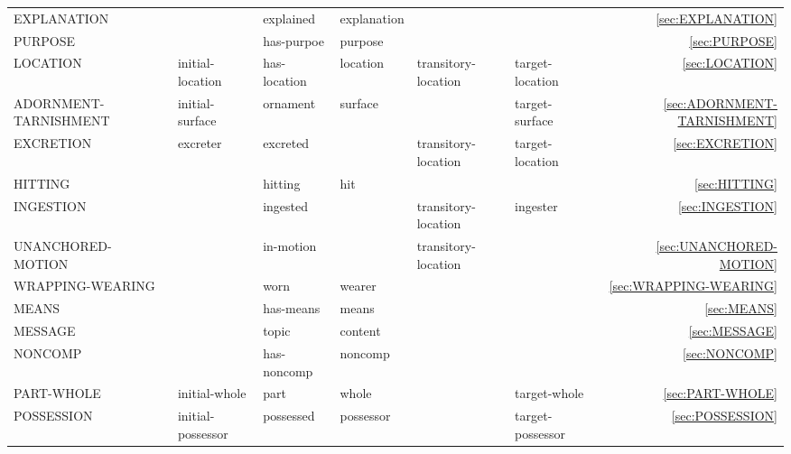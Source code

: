 \documentclass[a4paper]{article}
\newcommand{\fr}[1]{\textsf{#1}}
\newcommand{\rl}[1]{\textsf{#1}}
\newcommand{\Sub}{\textnoto{└} }
\newcommand{\SubSub}{\textcolor{white}{\Sub}\Sub}
\newcommand{\SubSubSub}{\textcolor{white}{\Sub}\SubSub}
\begin{document}
\begin{table}
{\begin{NiceTabular}{llllllr}
            \SubSub{} \fr{EXPLANATION} & & \rl{explained} & \rl{explanation} & & & \ref{sec:EXPLANATION} \\
            \SubSubSub{} \fr{PURPOSE} & & \rl{has-purpoe} & \rl{purpose} & & & \ref{sec:PURPOSE} \\

            \SubSub{} \fr{LOCATION} & \rl{initial-location} & \rl{has-location} & \rl{location} & \rl{transitory-location} & \rl{target-location} & \ref{sec:LOCATION} \\
            \SubSubSub{} \fr{ADORNMENT-TARNISHMENT} & \rl{initial-surface} & \rl{ornament} & \rl{surface} & & \rl{target-surface} & \ref{sec:ADORNMENT-TARNISHMENT} \\
            \SubSubSub{} \fr{EXCRETION} & \rl{excreter} & \rl{excreted} & & \rl{transitory-location} & \rl{target-location} & \ref{sec:EXCRETION} \\
            \SubSubSub{} \fr{HITTING} & & \rl{hitting} & \rl{hit} & & & \ref{sec:HITTING} \\
            \SubSubSub{} \fr{INGESTION} & & \rl{ingested} & & \rl{transitory-location} & \rl{ingester} & \ref{sec:INGESTION} \\
            \SubSubSub{} \fr{UNANCHORED-MOTION} & & \rl{in-motion} & & \rl{transitory-location} & & \ref{sec:UNANCHORED-MOTION} \\
            \SubSubSub{} \fr{WRAPPING-WEARING} & & \rl{worn} & \rl{wearer} & & & \ref{sec:WRAPPING-WEARING} \\

            \SubSub{} \fr{MEANS} & & \rl{has-means} & \rl{means} & & & \ref{sec:MEANS} \\

            \SubSub{} \fr{MESSAGE} & & \rl{topic} & \rl{content} & & & \ref{sec:MESSAGE} \\

            \SubSub{} \fr{NONCOMP} & & \rl{has-noncomp} & \rl{noncomp} & & & \ref{sec:NONCOMP} \\

            \SubSub{} \fr{PART-WHOLE} & \rl{initial-whole} & \rl{part} & \rl{whole} & & \rl{target-whole} & \ref{sec:PART-WHOLE} \\

            \SubSub{} \fr{POSSESSION} & \rl{initial-possessor} & \rl{possessed} & \rl{possessor} & & \rl{target-possessor} & \ref{sec:POSSESSION} \\


\end{NiceTabular}}
\end{table}
\end{document}
